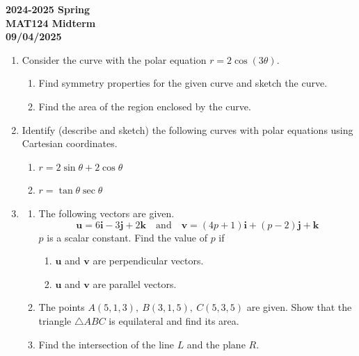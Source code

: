 \documentclass[a4paper, 12pt]{article}
\begin{document}
\pagestyle{empty}

\begin{center}
\textbf{2024-2025 Spring \\MAT124 Midterm\\09/04/2025}
\end{center}

\begin{enumerate}[leftmargin=*,label=\textbf{\arabic*.}]
\item Consider the curve with the polar equation $r=2\cos(3\theta)$.

\begin{enumerate}[leftmargin=*,label=\textbf{\alph*.}]
\item Find symmetry properties for the given curve and sketch the curve.
\item Find the area of the region enclosed by the curve.
\end{enumerate}

\item Identify (describe and sketch) the following curves with polar equations using Cartesian coordinates.
\begin{enumerate}[leftmargin=*,label=\textbf{\alph*.}]
\item $r=2\sin\theta +2\cos\theta$
\item $r=\tan\theta\sec\theta$
\end{enumerate}

\item \begin{enumerate}[leftmargin=*,label=\textbf{\alph*.}]
\item The following vectors are given.
\[\mathbf{u}=6\mathbf{i}-3\mathbf{j}+2\mathbf{k}\quad\text{and}\quad\mathbf{v}=(4{p}+1)\mathbf{i}+({p}-2)\mathbf{j}+\mathbf{k}\]
${p}$ is a scalar constant. Find the value of ${p}$ if
\begin{enumerate}[leftmargin=*,label=\textbf{\roman*.}]
\item $\mathbf{u}$ and $\mathbf{v}$ are perpendicular vectors. 
\item $\mathbf{u}$ and $\mathbf{v}$ are parallel vectors.
\end{enumerate}

\item The points $A(5,1,3),\:B(3,1,5),\:C(5,3,5)$ are given. Show that the triangle $\triangle{ABC}$ is equilateral and find its area.

\item Find the intersection of the line $L$ and the plane $R$.


\end{enumerate}
\end{enumerate}
\end{document}
